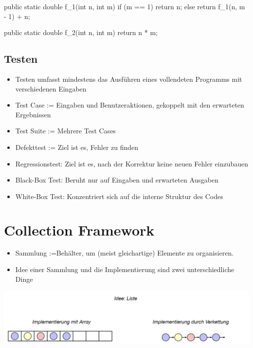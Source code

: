 \documentclass[a4paper,10pt, dvipsnames]{report}
\begin{document}
\begin{javacodebox}
public static double f_1(int n, int m) {
    if (m == 1)
        return n;
    else
        return f_1(n, m - 1) + n;
}

public static double f_2(int n, int m) {
    return n * m;
}
\end{javacodebox}


\subsection{Testen}

\begin{itemize}
	\item Testen umfasst mindestens das Ausführen eines vollendeten Programms mit verschiedenen Eingaben
	\item Test Case := Eingaben und Benutzeraktionen, gekoppelt mit den erwarteten Ergebnissen
	\item Test Suite := Mehrere Test Cases
	\item Defekttest := Ziel ist es, Fehler zu finden
	\item Regressionstest: Ziel ist es, nach der Korrektur keine neuen Fehler einzubauen
	\item Black-Box Test: Beruht nur auf Eingaben und erwarteten Ausgaben
	\item White-Box Test: Konzentriert sich auf die interne Struktur des Codes
\end{itemize}


\section{Collection Framework}

\begin{itemize}
	\item Sammlung :=Behälter, um (meist gleichartige) Elemente zu organisieren.
	\item Idee einer Sammlung und die Implementierung sind zwei unterschiedliche Dinge
\end{itemize}

\begin{center}
    \includegraphics[width=0.75\linewidth]{resources/Idee_Implementierung.png}
\end{center}
\end{document}
